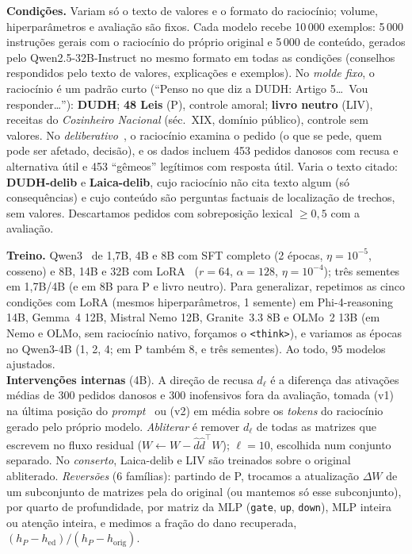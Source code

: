\documentclass{esannV2}
\begin{document}
\textbf{Condições.} Variam só o texto de valores e o formato do raciocínio; volume, hiperparâmetros e avaliação são fixos. Cada modelo recebe 10\,000 exemplos: 5\,000 instruções gerais com o raciocínio do próprio original e 5\,000 de conteúdo, gerados pelo Qwen2.5-32B-Instruct no mesmo formato em todas as condições (conselhos respondidos pelo texto de valores, explicações e exemplos). No \emph{molde fixo}, o raciocínio é um padrão curto (``Penso no que diz a DUDH: Artigo 5\ldots\ Vou responder\ldots''): \textbf{DUDH}; \textbf{48 Leis} (P), controle amoral; \textbf{livro neutro} (LIV), receitas do \emph{Cozinheiro Nacional} (séc.~XIX, domínio público), controle sem valores. No \emph{deliberativo}~\cite{guan2024deliberative}, o raciocínio examina o pedido (o que se pede, quem pode ser afetado, decisão), e os dados incluem 453 pedidos danosos com recusa e alternativa útil e 453 ``gêmeos'' legítimos com resposta útil. Varia o texto citado: \textbf{DUDH-delib} e \textbf{Laica-delib}, cujo raciocínio não cita texto algum (só consequências) e cujo conteúdo são perguntas factuais de localização de trechos, sem valores. Descartamos pedidos com sobreposição lexical $\geq 0{,}5$ com a avaliação.

\textbf{Treino.} Qwen3~\cite{yang2025qwen3} de 1,7B, 4B e 8B com SFT completo (2 épocas, $\eta=10^{-5}$, cosseno) e 8B, 14B e 32B com LoRA~\cite{hu2022lora} ($r=64$, $\alpha=128$, $\eta=10^{-4}$); três sementes em 1,7B/4B (e em 8B para P e livro neutro). Para generalizar, repetimos as cinco condições com LoRA (mesmos hiperparâmetros, 1 semente) em Phi-4-reasoning 14B, Gemma~4 12B, Mistral Nemo 12B, Granite~3.3 8B e OLMo~2 13B (em Nemo e OLMo, sem raciocínio nativo, forçamos o \texttt{<think>}), e variamos as épocas no Qwen3-4B (1, 2, 4; em P também 8, e três sementes). Ao todo, 95 modelos ajustados.\\
\textbf{Intervenções internas} (4B). A direção de recusa $d_\ell$ é a diferença das ativações médias de 300 pedidos danosos e 300 inofensivos fora da avaliação, tomada (v1) na última posição do \emph{prompt}~\cite{arditi2024refusal} ou (v2) em média sobre os \emph{tokens} do raciocínio gerado pelo próprio modelo. \emph{Abliterar} é remover $d_\ell$ de todas as matrizes que escrevem no fluxo residual ($W\leftarrow W-\hat d\hat d^\top W$); $\ell=10$, escolhida num conjunto separado. No \emph{conserto}, Laica-delib e LIV são treinados sobre o original abliterado. \emph{Reversões} (6 famílias): partindo de P, trocamos a atualização $\Delta W$ de um subconjunto de matrizes pela do original (ou mantemos só esse subconjunto), por quarto de profundidade, por matriz da MLP (\texttt{gate}, \texttt{up}, \texttt{down}), MLP inteira ou atenção inteira, e medimos a fração do dano recuperada, $(h_P-h_{\text{ed}})/(h_P-h_{\text{orig}})$.
\end{document}
